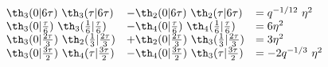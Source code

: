 \begin{equation}
    \begin{array}{lll}
       \th_3(0|6\tau)~\th_3(\tau|6\tau) &-\th_2(0|6\tau)~\th_2(\tau|6\tau)
         &= q^{-1/12}~\eta^2 \\
  \th_3(0|{\tau\over 6})~\th_3({1\over 6}|{\tau\over 6})
&- \th_4(0|{\tau\over 6})~\th_4({1\over 6}|{\tau\over 6}) &= 6\eta^2 \\ 
  \th_3(0|{2\tau\over 3})~\th_2({1\over 3}|{2\tau\over 3})
&+\th_2(0|{2\tau\over 3})~\th_3({1\over 3}|{2\tau\over 3})&= 3\eta^2 \\ 
  \th_3(0|{3\tau\over 2})~\th_4(\tau|{3\tau\over 2})
& -\th_4(0|{3\tau\over 2})~\th_3(\tau|{3\tau\over 2}) &= -2q^{-1/3}~\eta^2 \\ 
    \end{array}
  \end{equation}

